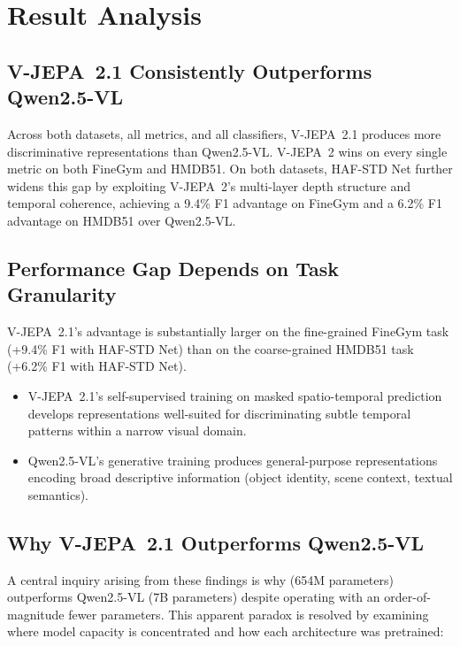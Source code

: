 \section{Result Analysis}

\subsection{V-JEPA~2.1 Consistently Outperforms Qwen2.5-VL}

Across both datasets, all metrics, and all classifiers, V-JEPA~2.1 produces more discriminative representations than Qwen2.5-VL. V-JEPA~2 wins on every single metric on both FineGym and HMDB51. On both datasets, HAF-STD Net further widens this gap by exploiting V-JEPA~2's multi-layer depth structure and temporal coherence, achieving a 9.4\% F1 advantage on FineGym and a 6.2\% F1 advantage on HMDB51 over Qwen2.5-VL.

\subsection{Performance Gap Depends on Task Granularity}

V-JEPA~2.1's advantage is substantially larger on the fine-grained FineGym task (+9.4\% F1 with HAF-STD Net) than on the coarse-grained HMDB51 task (+6.2\% F1 with HAF-STD Net).

\begin{itemize}[leftmargin=*]
    \item V-JEPA~2.1's self-supervised training on masked spatio-temporal prediction develops representations well-suited for discriminating subtle temporal patterns within a narrow visual domain.
    \item Qwen2.5-VL's generative training produces general-purpose representations encoding broad descriptive information (object identity, scene context, textual semantics).
\end{itemize}

\subsection{Why V-JEPA~2.1 Outperforms Qwen2.5-VL}

A central inquiry arising from these findings is why \vjepaa{} (654M parameters) outperforms Qwen2.5-VL (7B parameters) despite operating with an order-of-magnitude fewer parameters. This apparent paradox is resolved by examining where model capacity is concentrated and how each architecture was pretrained:

